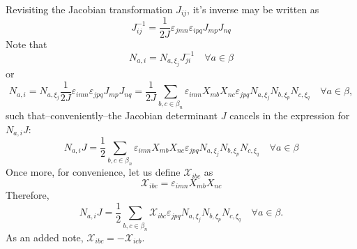 \documentclass[11pt]{article} %
\begin{document}
Revisiting the Jacobian transformation $J_{ij}$, it's inverse may be written as
\begin{equation}
	J^{-1}_{ij} = \frac{1}{2 J} \varepsilon_{jmn} \varepsilon_{ipq} J_{mp} J_{nq}
\end{equation}
Note that
\begin{equation}
	N_{a,i} = N_{a,\xi_j} J^{-1}_{ji} \quad \forall a \in \beta
\end{equation}
or
\begin{equation}
	N_{a,i} = N_{a,\xi_j} \frac{1}{2 J} \varepsilon_{imn} \varepsilon_{jpq} J_{mp} J_{nq} = \frac{1}{2 J} \sum_{b, c \in \beta_n} \varepsilon_{imn} X_{mb} X_{nc} \varepsilon_{jpq} N_{a,\xi_j} N_{b,\xi_p} N_{c,\xi_q} \quad \forall a \in \beta,
\end{equation}
such that--conveniently--the Jacobian determinant $J$ cancels in the expression for $N_{a,i} J$:
\begin{equation}
	N_{a,i} J = \frac{1}{2} \sum_{b, c \in \beta_n} \varepsilon_{imn} X_{mb} X_{nc} \varepsilon_{jpq} N_{a,\xi_j} N_{b,\xi_p} N_{c,\xi_q} \quad \forall a \in \beta
\end{equation}
Once more, for convenience, let us define $\mathcal{X}_{ibc}$ as
\begin{equation}
	\mathcal{X}_{ibc} = \varepsilon_{imn} X_{mb} X_{nc}
\end{equation}
Therefore,
\begin{equation}
	N_{a,i} J = \frac{1}{2} \sum_{b, c \in \beta_n} \mathcal{X}_{ibc} \varepsilon_{jpq} N_{a,\xi_j} N_{b,\xi_p} N_{c,\xi_q} \quad \forall a \in \beta.
\end{equation}
As an added note, $\mathcal{X}_{ibc} = -\mathcal{X}_{icb}$.
\end{document}
